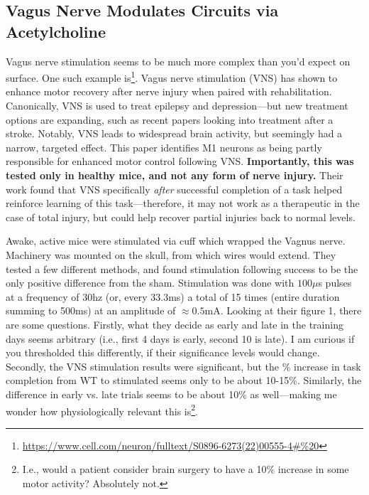 \documentclass[12pt]{report}
\begin{document}
\subsection{Vagus Nerve Modulates Circuits via Acetylcholine}

Vagus nerve stimulation seems to be much more complex than you'd expect on surface. One such example is\footnote{\url{https://www.cell.com/neuron/fulltext/S0896-6273(22)00555-4\#\%20}}. Vagus nerve stimulation (VNS) has shown to enhance motor recovery after nerve injury when paired with rehabilitation. Canonically, VNS is used to treat epilepsy and depression---but new treatment options are expanding, such as recent papers looking into treatment after a stroke. Notably, VNS leads to widespread brain activity, but seemingly had a narrow, targeted effect. This paper identifies M1 neurons as being partly responsible for enhanced motor control following VNS. \textbf{Importantly, this was tested only in healthy mice, and not any form of nerve injury.} Their work found that VNS specifically \textit{after} successful completion of a task helped reinforce learning of this task---therefore, it may not work as a therapeutic in the case of total injury, but could help recover partial injuries back to normal levels.\newline

Awake, active mice were stimulated via cuff which wrapped the Vagnus nerve. Machinery was mounted on the skull, from which wires would extend. They tested a few different methods, and found stimulation following success to be the only positive difference from the sham. Stimulation was done with $100\mu$s pulses at a frequency of 30hz (or, every 33.3ms) a total of 15 times (entire duration summing to 500ms) at an amplitude of $\approx 0.5$mA. Looking at their figure 1, there are some questions. Firstly, what they decide as early and late in the training days seems arbitrary (i.e., first 4 days is early, second 10 is late). I am curious if you thresholded this differently, if their significance levels would change. Secondly, the VNS stimulation results were significant, but the \% increase in task completion from WT to stimulated seems only to be about 10-15\%. Similarly, the difference in early vs. late trials seems to be about 10\% as well---making me wonder how physiologically relevant this is\footnote{I.e., would a patient consider brain surgery to have a 10\% increase in some motor activity? Absolutely not.}.\newline
\end{document}
